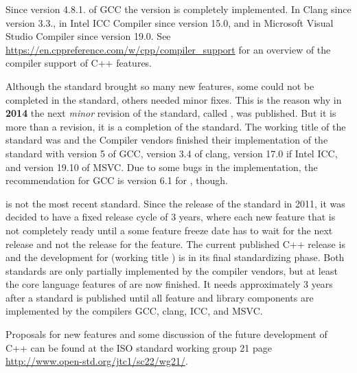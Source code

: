 Since version 4.8.1. of GCC the  version is completely implemented. In Clang since version 3.3., in Intel ICC Compiler since version 15.0,
and in Microsoft Visual Studio Compiler since version 19.0. See \url{https://en.cppreference.com/w/cpp/compiler_support} for an overview of
the compiler support of C++ features.

Although the  standard brought so many new features, some could not be completed in the standard, others needed minor fixes. This is the reason
why in \textbf{2014} the next \emph{minor} revision of the standard, called , was published. But it is more than a revision, it is a completion
of the  standard. The working title of the standard was  and the Compiler vendors finished their implementation of the standard
with version 5 of GCC, version 3.4 of clang, version 17.0 if Intel ICC, and version 19.10 of MSVC. Due to some bugs in the implementation,
the recommendation for GCC is version 6.1 for , though.

 is not the most recent standard. Since the release of the  standard in 2011, it was decided to have a fixed release cycle of 3 years,
where each new feature that is not completely ready until a some feature freeze date has to wait for the next release and not the release for the feature.
The current published C++ release is  and the development for  (working title ) is in its
final standardizing phase. Both standards are only partially implemented by the compiler vendors, but at least the core language features
of  are now finished. It needs approximately 3 years after a standard is published until all feature and library components are
implemented by the compilers GCC, clang, ICC, and MSVC.

Proposals for new features and some discussion of the future development of C++ can be found at the ISO standard working group 21 page
\url{http://www.open-std.org/jtc1/sc22/wg21/}.
